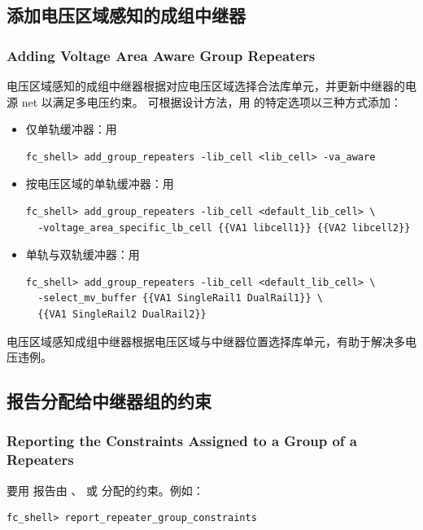 \subsection{添加电压区域感知的成组中继器}
\subsubsection*{Adding Voltage Area Aware Group Repeaters}

电压区域感知的成组中继器根据对应电压区域选择合法库单元，并更新中继器的电源 net 以满足多电压约束。
可根据设计方法，用  的特定选项以三种方式添加：
\begin{itemize}
  \item 仅单轨缓冲器：用 
\begin{lstlisting}
fc_shell> add_group_repeaters -lib_cell <lib_cell> -va_aware
\end{lstlisting}
  \item 按电压区域的单轨缓冲器：用 
\begin{lstlisting}
fc_shell> add_group_repeaters -lib_cell <default_lib_cell> \
  -voltage_area_specific_lb_cell {{VA1 libcell1}} {{VA2 libcell2}}
\end{lstlisting}
  \item 单轨与双轨缓冲器：用 
\begin{lstlisting}
fc_shell> add_group_repeaters -lib_cell <default_lib_cell> \
  -select_mv_buffer {{VA1 SingleRail1 DualRail1}} \
  {{VA1 SingleRail2 DualRail2}}
\end{lstlisting}
\end{itemize}
电压区域感知成组中继器根据电压区域与中继器位置选择库单元，有助于解决多电压违例。

\subsection{报告分配给中继器组的约束}
\subsubsection*{Reporting the Constraints Assigned to a Group of a Repeaters}

要用  报告由 、 或  分配的约束。例如：
\begin{lstlisting}
fc_shell> report_repeater_group_constraints
\end{lstlisting}

